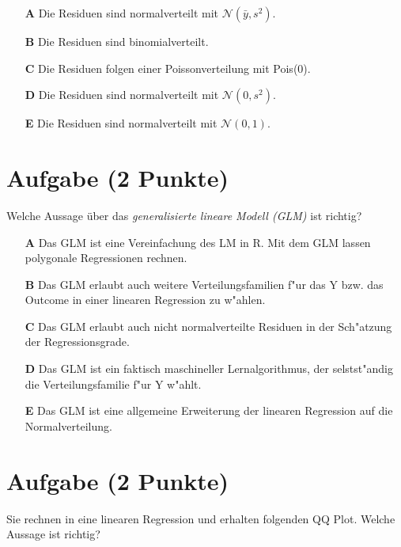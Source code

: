 \documentclass[a4paper, 10pt]{scrartcl}\usepackage[]{graphicx}\usepackage[]{xcolor}
\begin{document}
\begin{enumerate}
\item [\textbf{A} \msquare] Die Residuen sind normalverteilt mit $\mathcal{N}(\bar{y}, s^2)$.
\item [\textbf{B} \msquare] Die Residuen sind binomialverteilt.
\item [\textbf{C} \msquare] Die Residuen folgen einer Poissonverteilung mit Pois(0).
\item [\textbf{D} \msquare] Die Residuen sind normalverteilt mit $\mathcal{N}(0, s^2)$.
\item [\textbf{E} \msquare] Die Residuen sind normalverteilt mit $\mathcal{N}(0, 1)$.
\end{enumerate}

\section{Aufgabe \hfill (2 Punkte)}

Welche Aussage {\"u}ber das \textit{generalisierte lineare Modell (GLM)} ist richtig?  



\begin{enumerate}
\item [\textbf{A} \msquare] Das GLM ist eine Vereinfachung des LM in R. Mit dem GLM lassen polygonale Regressionen rechnen.
\item [\textbf{B} \msquare] Das GLM erlaubt auch weitere Verteilungsfamilien f{"u}r das Y bzw. das Outcome in einer linearen Regression zu w{"a}hlen.
\item [\textbf{C} \msquare] Das GLM erlaubt auch nicht normalverteilte Residuen in der Sch{"a}tzung der Regressionsgrade.
\item [\textbf{D} \msquare] Das GLM ist ein faktisch maschineller Lernalgorithmus, der selstst{"a}ndig die Verteilungsfamilie f{"u}r Y w{"a}hlt.
\item [\textbf{E} \msquare] Das GLM ist eine allgemeine Erweiterung der linearen Regression auf die Normalverteilung.
\end{enumerate}

\section{Aufgabe \hfill (2 Punkte)}

Sie rechnen in eine linearen Regression und erhalten folgenden QQ
Plot. Welche Aussage ist richtig?
\end{document}
